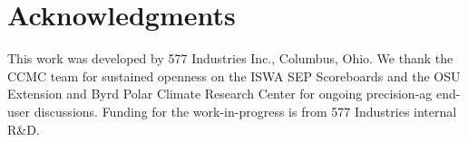 \documentclass[11pt,letterpaper]{article}
\begin{document}
\section*{Acknowledgments}

This work was developed by 577 Industries Inc., Columbus, Ohio.  We thank
the CCMC team for sustained openness on the ISWA SEP Scoreboards
\cite{ccmc_iswa,whitman2024} and the OSU Extension and Byrd Polar Climate
Research Center for ongoing precision-ag end-user discussions.  Funding for
the work-in-progress is from 577 Industries internal R\&D.



\end{document}
